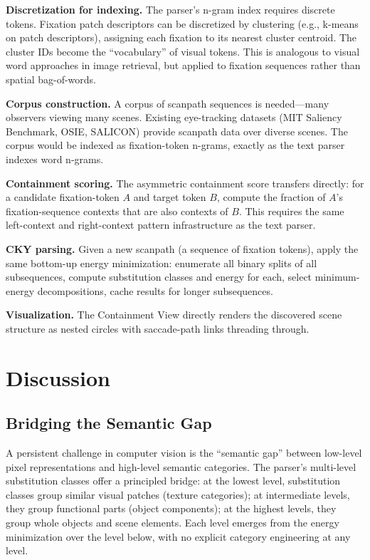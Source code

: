 \documentclass[11pt,a4paper]{article}
\begin{document}
\textbf{Discretization for indexing.} The parser's n-gram index requires discrete tokens. Fixation patch descriptors can be discretized by clustering (e.g., k-means on patch descriptors), assigning each fixation to its nearest cluster centroid. The cluster IDs become the ``vocabulary'' of visual tokens. This is analogous to visual word approaches in image retrieval, but applied to fixation sequences rather than spatial bag-of-words.

\textbf{Corpus construction.} A corpus of scanpath sequences is needed---many observers viewing many scenes. Existing eye-tracking datasets (MIT Saliency Benchmark, OSIE, SALICON) provide scanpath data over diverse scenes. The corpus would be indexed as fixation-token n-grams, exactly as the text parser indexes word n-grams.

\textbf{Containment scoring.} The asymmetric containment score transfers directly: for a candidate fixation-token $A$ and target token $B$, compute the fraction of $A$'s fixation-sequence contexts that are also contexts of $B$. This requires the same left-context and right-context pattern infrastructure as the text parser.

\textbf{CKY parsing.} Given a new scanpath (a sequence of fixation tokens), apply the same bottom-up energy minimization: enumerate all binary splits of all subsequences, compute substitution classes and energy for each, select minimum-energy decompositions, cache results for longer subsequences.

\textbf{Visualization.} The Containment View directly renders the discovered scene structure as nested circles with saccade-path links threading through.

\section{Discussion}

\subsection{Bridging the Semantic Gap}

A persistent challenge in computer vision is the ``semantic gap'' between low-level pixel representations and high-level semantic categories. The parser's multi-level substitution classes offer a principled bridge: at the lowest level, substitution classes group similar visual patches (texture categories); at intermediate levels, they group functional parts (object components); at the highest levels, they group whole objects and scene elements. Each level emerges from the energy minimization over the level below, with no explicit category engineering at any level.
\end{document}
